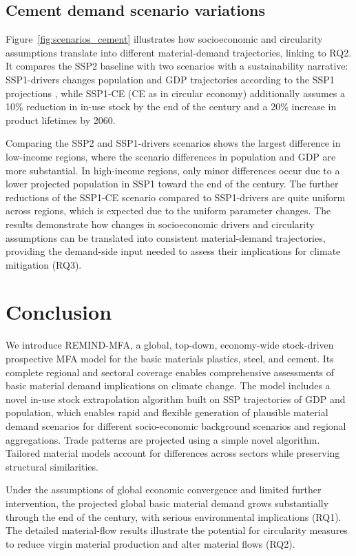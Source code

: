 \documentclass[pdflatex]{sn-jnl}
\begin{document}
\subsection{Cement demand scenario variations}\label{sec:res_scenarios}
Figure~\ref{fig:scenarios_cement} illustrates how socioeconomic and circularity assumptions translate into different material-demand trajectories, linking to RQ2. It compares the SSP2 baseline with two scenarios with a sustainability narrative: SSP1-drivers changes population and GDP trajectories according to the SSP1 projections \parencite{dellinkLongtermEconomicGrowth2017a}, while SSP1-CE (CE as in circular economy) additionally assumes a 10\% reduction in in-use stock by the end of the century and a 20\% increase in product lifetimes by 2060.

Comparing the SSP2 and SSP1-drivers scenarios shows the largest difference in low-income regions, where the scenario differences in population and GDP are more substantial. In high-income regions, only minor differences occur due to a lower projected population in SSP1 toward the end of the century. The further reductions of the SSP1-CE scenario compared to SSP1-drivers are quite uniform across regions, which is expected due to the uniform parameter changes. The results demonstrate how changes in socioeconomic drivers and circularity assumptions can be translated into consistent material-demand trajectories, providing the demand-side input needed to assess their implications for climate mitigation (RQ3).

\section{Conclusion}\label{sec:conclusion}
We introduce REMIND-MFA, a global, top-down, economy-wide stock-driven prospective MFA model for the basic materials plastics, steel, and cement. Its complete regional and sectoral coverage enables comprehensive assessments of basic material demand implications on climate change. The model includes a novel in-use stock extrapolation algorithm built on SSP trajectories of GDP and population, which enables rapid and flexible generation of plausible material demand scenarios for different socio-economic background scenarios and regional aggregations. Trade patterns are projected using a simple novel algorithm. Tailored material models account for differences across sectors while preserving structural similarities.

Under the assumptions of global economic convergence and limited further intervention, the projected global basic material demand grows substantially through the end of the century, with serious environmental implications (RQ1). The detailed material-flow results illustrate the potential for circularity measures to reduce virgin material production and alter material flows (RQ2).
\end{document}

